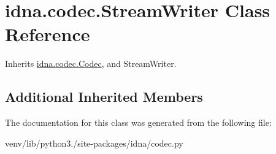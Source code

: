 \hypertarget{classidna_1_1codec_1_1_stream_writer}{}\section{idna.\+codec.\+Stream\+Writer Class Reference}
\label{classidna_1_1codec_1_1_stream_writer}


Inherits \hyperlink{classidna_1_1codec_1_1_codec}{idna.\+codec.\+Codec}, and Stream\+Writer.

\subsection*{Additional Inherited Members}


The documentation for this class was generated from the following file\+:\begin{DoxyCompactItemize}
\item 
venv/lib/python3./site-\/packages/idna/codec.\+py\end{DoxyCompactItemize}
